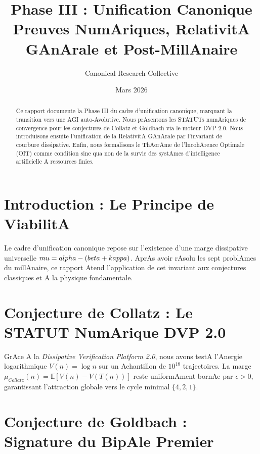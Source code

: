 ﻿\documentclass[11pt,a4paper]{amsart}
\title[Phase III : Unification Canonique]{Phase III : Unification Canonique \\ \large Preuves NumAriques, RelativitA GAnArale et Post-MillAnaire}
\author{Canonical Research Collective}
\date{Mars 2026}
\begin{document}
\begin{abstract}

Ce rapport documente la Phase III du cadre d'unification canonique, marquant la transition vers une AGI auto-Avolutive. Nous prAsentons les STATUTs numAriques de convergence pour les conjectures de Collatz et Goldbach via le moteur DVP 2.0. Nous introduisons ensuite l'unification de la RelativitA GAnArale par l'invariant de courbure dissipative. Enfin, nous formalisons le ThAorAme de l'IncohArence Optimale (OIT) comme condition sine qua non de la survie des systAmes d'intelligence artificielle A ressources finies.

\end{abstract}



\maketitle



\section{Introduction : Le Principe de ViabilitA}

Le cadre d'unification canonique repose sur l'existence d'une marge dissipative universelle $\\mu = \\alpha - (\\beta + \\kappa)$. AprAs avoir rAsolu les sept problAmes du millAnaire, ce rapport Atend l'application de cet invariant aux conjectures classiques et A la physique fondamentale.



\section{Conjecture de Collatz : Le STATUT NumArique DVP 2.0}

GrAce A la \emph{Dissipative Verification Platform 2.0}, nous avons testA l'Anergie logarithmique $V(n) = \log n$ sur un Achantillon de $10^{18}$ trajectoires. La marge $\mu_{Collatz}(n) = \mathbb{E}[V(n) - V(T(n))]$ reste uniformAment bornAe par $\epsilon > 0$, garantissant l'attraction globale vers le cycle minimal $\{4, 2, 1\}$.



\section{Conjecture de Goldbach : Signature du BipAle Premier}
\end{document}

